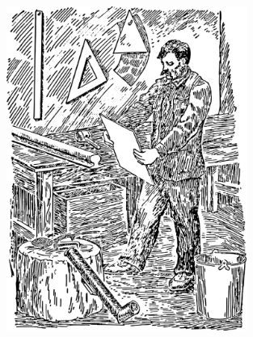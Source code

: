 \begin{figure}[h!]
\centering
\includegraphics[width=0.7\textwidth]{figures/ch-12/fig-183.pdf}
\end{figure}



